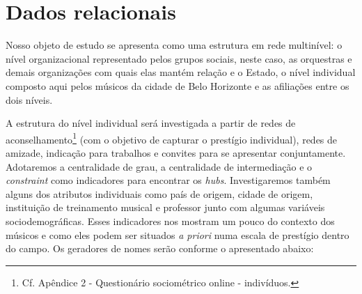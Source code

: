 \documentclass[a4paper, 12pt, openright, oneside, german, french, english, brazil]{abntex2}
\begin{document}
	
	
	\section{Dados relacionais}
	
	
	Nosso objeto de estudo se apresenta como uma estrutura em rede multinível: o nível organizacional representado pelos grupos sociais, neste caso, as orquestras e demais organizações com quais elas mantém relação e o Estado, o nível individual composto aqui pelos músicos da cidade de Belo Horizonte e as afiliações entre os dois níveis.
	

	
	A estrutura do nível individual será investigada a partir de redes de aconselhamento\footnote{Cf. Apêndice 2 - Questionário sociométrico online - indivíduos.} (com o objetivo de capturar o prestígio individual), redes de amizade, indicação para trabalhos e convites para se apresentar conjuntamente. Adotaremos a centralidade de grau, a centralidade de intermediação e o \textit{constraint} como indicadores para encontrar os \textit{hubs}. Investigaremos também alguns dos atributos individuais como país de origem, cidade de origem, instituição de treinamento musical e professor junto com algumas variáveis sociodemográficas. Esses indicadores nos mostram um pouco do contexto dos músicos e como eles podem ser situados \textit{a priori} numa escala de prestígio dentro do campo. Os geradores de nomes serão conforme o apresentado abaixo:
	
\end{document}

